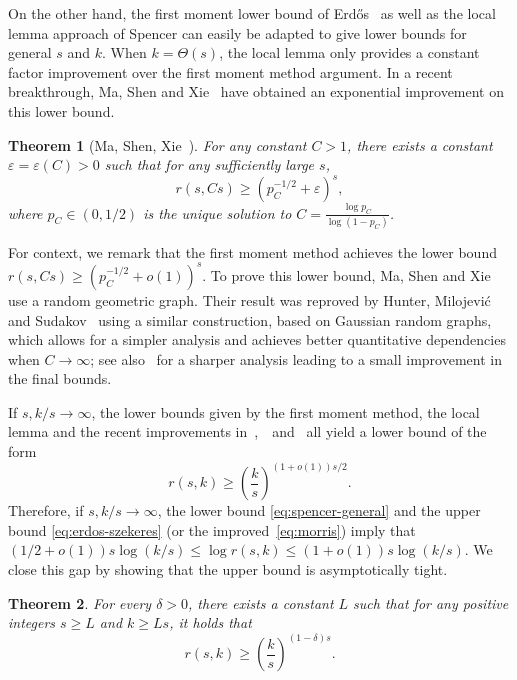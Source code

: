\documentclass{article}
\theoremstyle{plain}
\newtheorem{theorem}{Theorem}[section]
\theoremstyle{definition}
\def\eps {\varepsilon}
\begin{document}
On the other hand, the first moment lower bound of Erd\H{o}s~\cite{erdos-lb} as well as the local lemma approach of Spencer can easily be adapted to give lower bounds for general $s$ and $k$. When $k = \Theta(s)$, the local lemma only provides a constant factor improvement over the first moment method argument. In a recent breakthrough, Ma, Shen and Xie~\cite{ma-shen-xie} have obtained an exponential improvement on this lower bound.

\begin{theorem}[Ma, Shen, Xie~\cite{ma-shen-xie}] \label{thm:ma-shen-xie}
    For any constant $C > 1$, there exists a constant $\eps = \eps(C) > 0$ such that for any sufficiently large $s$,
    \[ r(s, Cs) \ge (p_C^{-1/2} + \eps)^s, \]
    where $p_C \in (0, 1/2)$ is the unique solution to $C  = \frac{\log p_C}{\log (1 - p_C)}$.
\end{theorem}

For context, we remark that the first moment method achieves the lower bound $r(s, Cs) \ge (p_C^{-1/2} + o(1))^s$. To prove this lower bound, Ma, Shen and Xie use a random geometric graph. Their result was reproved by Hunter, Milojevi\'{c} and Sudakov~\cite{hunter-milojevic-sudakov} using a similar construction, based on Gaussian random graphs, which allows for a simpler analysis and achieves better quantitative dependencies when $C \rightarrow \infty$; see also~\cite{lin-niu} for a sharper analysis leading to a small improvement in the final bounds.

If $s, k/s \rightarrow \infty$, the lower bounds given by the first moment method, the local lemma and the recent improvements in~\cite{ma-shen-xie},~\cite{hunter-milojevic-sudakov}~and~\cite{lin-niu} all yield a lower bound of the form
\begin{equation} \label{eq:spencer-general}
    r(s, k) \ge \left( \frac{k}{s} \right)^{(1 + o(1))s/2}.
\end{equation}
Therefore, if $s, k/s \rightarrow \infty$, the lower bound \eqref{eq:spencer-general} and the upper bound \eqref{eq:erdos-szekeres} (or the improved~\eqref{eq:morris}) imply that\linebreak $(1 / 2 + o(1)) s \log(k/s) \le \log r(s, k) \le (1 + o(1)) s \log(k/s)$. We close this gap by showing that the upper bound is asymptotically tight.

\begin{theorem} \label{thm:off-diagonal-general}
    For every $\delta > 0$, there exists a constant $L$ such that for any positive integers $s \ge L$ and $k \ge Ls$, it holds that 
    \[ r(s, k) \ge \left( \frac{k}{s}\right)^{(1 - \delta) s}. \]
\end{theorem}
\end{document}
